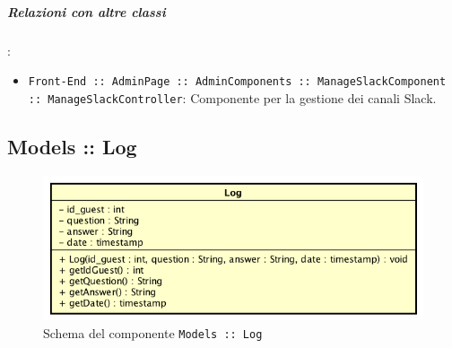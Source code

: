 \documentclass[../ManualeSviluppatore_v1.0.0.tex]{subfiles}
\begin{document}
			\subparagraph{Relazioni con altre classi}:
			\begin{itemize}
				\item \texttt{Front-End :: AdminPage :: AdminComponents :: ManageSlackComponent :: ManageSlackController}: Componente per la gestione dei canali Slack.
			\end{itemize}


	\newpage
	\subsection{Models :: Log}
	\begin{figure}[!h]
		\centering
		\includegraphics[scale=0.6]{Architettura/Front-End/Models/Log.png}
		\caption{Schema del componente \texttt{Models :: Log}}
	\end{figure}
\end{document}
